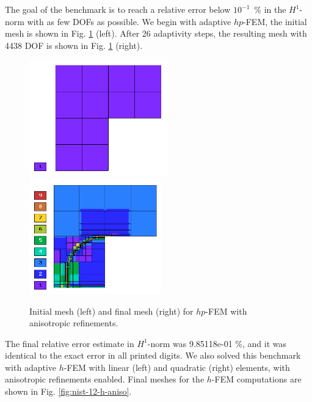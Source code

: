 The goal of the benchmark is to reach a relative error below
$10^{-1}$~\% in the $H^1$-norm with as few DOFs as possible.
We begin with adaptive $hp$-FEM,
the initial mesh is shown in Fig. \ref{fig:nist-12-hp-aniso} (left).
After 26 adaptivity steps, the resulting mesh with 4438 DOF is shown
in Fig. \ref{fig:nist-12-hp-aniso} (right).

\begin{figure}[!ht]
\centering
\includegraphics[height=5cm]{nist/nist-12/mesh_hp_aniso_init.png}\ \
\includegraphics[height=5cm]{nist/nist-12/mesh_hp_aniso.png}
\caption{Initial mesh (left) and final mesh (right) for $hp$-FEM with anisotropic refinements.}
\label{fig:nist-12-hp-aniso}
\end{figure}

The final relative error estimate in $H^1$-norm was 9.85118e-01 \%,
and it was identical to the exact error in all printed digits.
We also solved this benchmark with adaptive $h$-FEM
with linear (left) and quadratic (right)
elements, with anisotropic refinements enabled.
Final meshes for the $h$-FEM computations are shown
in Fig. \ref{fig:nist-12-h-aniso}.

